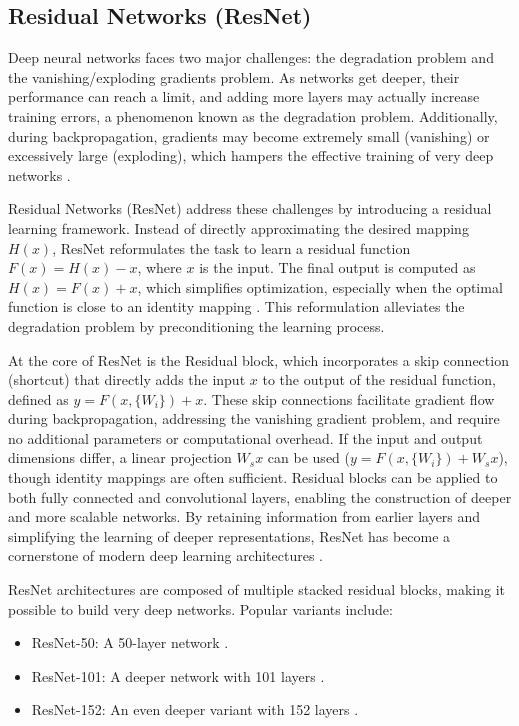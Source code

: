 \subsection{Residual Networks (ResNet)}

Deep neural networks faces two major challenges: the degradation problem and the vanishing/exploding gradients problem. As networks get deeper, their performance can reach a limit, and adding more layers may actually increase training errors, a phenomenon known as the degradation problem. Additionally, during backpropagation, gradients may become extremely small (vanishing) or excessively large (exploding), which hampers the effective training of very deep networks \cite{he2015deepresiduallearningimage}.

Residual Networks (ResNet) address these challenges by introducing a residual learning framework. Instead of directly approximating the desired mapping \( H(x) \), ResNet reformulates the task to learn a residual function \( F(x) = H(x) - x \), where \( x \) is the input. The final output is computed as \( H(x) = F(x) + x \), which simplifies optimization, especially when the optimal function is close to an identity mapping \cite{he2015deepresiduallearningimage}. This reformulation alleviates the degradation problem by preconditioning the learning process. 

At the core of ResNet is the Residual block, which incorporates a skip connection (shortcut) that directly adds the input \( x \) to the output of the residual function, defined as \( y = F(x, \{W_i\}) + x \). These skip connections facilitate gradient flow during backpropagation, addressing the vanishing gradient problem, and require no additional parameters or computational overhead. If the input and output dimensions differ, a linear projection \( W_sx \) can be used (\( y = F(x, \{W_i\}) + W_sx \)), though identity mappings are often sufficient. Residual blocks can be applied to both fully connected and convolutional layers, enabling the construction of deeper and more scalable networks. By retaining information from earlier layers and simplifying the learning of deeper representations, ResNet has become a cornerstone of modern deep learning architectures \cite{he2015deepresiduallearningimage}.

ResNet architectures are composed of multiple stacked residual blocks, making it possible to build very deep networks. Popular variants include:
\begin{itemize}
    \item ResNet-50: A 50-layer network \cite{he2015deepresiduallearningimage}.
    \item ResNet-101: A deeper network with 101 layers \cite{he2015deepresiduallearningimage}.
    \item ResNet-152: An even deeper variant with 152 layers \cite{he2015deepresiduallearningimage}.
\end{itemize}


